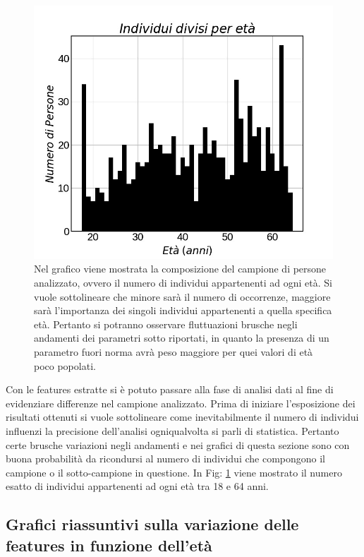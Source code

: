 \documentclass[12pt,a4paper, twoside, openright]{report}
\begin{document}
\begin{figure}[h!]
	\centering
	\includegraphics[width=\textwidth]{campione-age.jpg}
	\caption{Nel grafico viene mostrata la composizione del campione di persone analizzato, ovvero il numero di individui appartenenti ad ogni età.
Si vuole sottolineare che minore sarà il numero di occorrenze, maggiore sarà l'importanza dei singoli individui appartenenti a quella specifica età.
Pertanto si potranno osservare fluttuazioni brusche negli andamenti dei parametri sotto riportati, in quanto la presenza di un parametro fuori norma avrà peso maggiore per quei valori di età poco popolati.}
	\label{fig:campione-age}
\end{figure}


Con le features estratte si è potuto passare alla fase di analisi dati al fine di evidenziare differenze nel campione analizzato.
Prima di iniziare l'esposizione dei risultati ottenuti si vuole sottolineare come inevitabilmente il numero di individui influenzi la precisione dell'analisi ogniqualvolta si parli di statistica.
Pertanto certe brusche variazioni negli andamenti e nei grafici di questa sezione sono con buona probabilità da ricondursi al numero di individui che compongono il campione o il sotto-campione in questione. In Fig: \ref{fig:campione-age} viene mostrato il numero esatto di individui appartenenti ad ogni età tra 18 e 64 anni.



\subsection{Grafici riassuntivi sulla variazione delle features in funzione dell'età}
\end{document}
